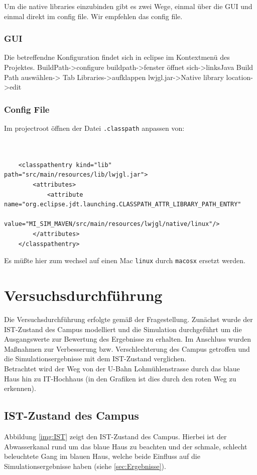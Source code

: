 \documentclass[10pt]{scrartcl}
\begin{document}
Um die native libraries einzubinden gibt es zwei Wege, einmal über die GUI und einmal direkt im config file. Wir empfehlen das config file.

\subsubsection{GUI}
Die betreffendne Konfiguration findet sich in eclipse im Kontextmenü des Projektes. BuildPath->configure buildpath->fenster öffnet sich->linksJava Build Path auswählen-> Tab Libraries->aufklappen lwjgl.jar->Native library location->edit

\subsubsection{Config File}
Im projectroot öffnen der Datei \verb!.classpath! anpassen von:\begin{verbatim}


	<classpathentry kind="lib" path="src/main/resources/lib/lwjgl.jar">
		<attributes>
			<attribute name="org.eclipse.jdt.launching.CLASSPATH_ATTR_LIBRARY_PATH_ENTRY" 
			value="MI_SIM_MAVEN/src/main/resources/lwjgl/native/linux"/>
		</attributes>
	</classpathentry> 
\end{verbatim}

Es müßte hier zum wechsel auf einen Mac \verb!linux! durch \verb!macosx! ersetzt werden.

\section{Versuchsdurchführung}
Die Versuchsdurchführung erfolgte gemäß der Fragestellung. Zunächst wurde der IST-Zustand des Campus modelliert und die Simulation durchgeführt um die Ausgangswerte zur Bewertung des Ergebnisse zu erhalten. Im Anschluss wurden Maßnahmen zur Verbesserung bzw. Verschlechterung des Campus getroffen und die Simulationsergebnisse mit dem IST-Zustand verglichen.\\
Betrachtet wird der Weg von der U-Bahn Lohmühlenstrasse durch das blaue Haus hin zu IT-Hochhaus (in den Grafiken ist dies durch den roten Weg zu erkennen).

\subsection{IST-Zustand des Campus}
Abbildung \ref{img:IST} zeigt den IST-Zustand des Campus. Hierbei ist der Abwasserkanal rund um das blaue Haus zu beachten und der schmale, schlecht beleuchtete Gang im blauen Haus, welche beide Einfluss auf die Simulationsergebnisse haben (siehe \ref{sec:Ergebnisse}).
\end{document}
